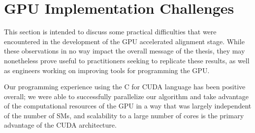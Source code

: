 \section{GPU Implementation Challenges}
This section is intended to discuss some practical difficulties that were 
encountered in the development of the GPU accelerated alignment stage.  While
these observations in no way impact the overall message of the thesis, they 
may nonetheless prove useful to practitioners seeking to replicate these
results, as well as engineers working on improving tools for programming
the GPU.

Our programming experience using the C for CUDA language has been positive
overall; we were able to successfully parallelize our algorithm and take
advantage of the computational resources of the GPU in a way that was largely
independent of the number of SMs, and scalability to a large number of cores
is the primary advantage of the CUDA architecture.

